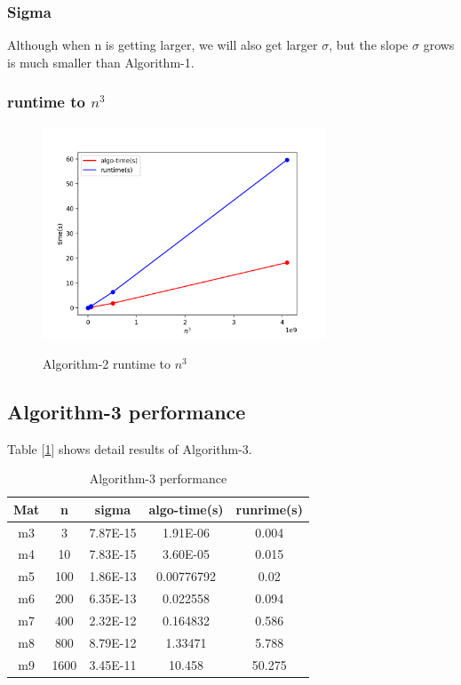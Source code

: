 \documentclass{article}
\begin{document}
\subsubsection{Sigma}
Although when n is getting larger, we will also get larger $\sigma$, but the slope $\sigma$ grows is much smaller than Algorithm-1.
\subsubsection{runtime to $n^3$}
\begin{figure}[H]
    \centering
    \caption{Algorithm-2 runtime to $n^3$}
    \includegraphics[width=0.75\textwidth]{src/algo2-runtime.png}
    \label{fig:algo2-runtime}
\end{figure}

\subsection{Algorithm-3 performance}
Table [\ref{tab:algo3}] shows detail results of Algorithm-3.
\begin{table}[htbp]
    \centering
    \caption{Algorithm-3 performance}
    \begin{tabular}{|c|c|c|c|c|}
        \hline
        Mat & \multicolumn{1}{c|}{n} & \multicolumn{1}{c|}{sigma} & \multicolumn{1}{l|}{algo-time(s)} & \multicolumn{1}{c|}{runrime(s)} \bigstrut\\
        \hline
        m3  & 3   & 7.87E-15 & 1.91E-06 & 0.004 \bigstrut\\
        \hline
        m4  & 10  & 7.83E-15 & 3.60E-05 & 0.015 \bigstrut\\
        \hline
        m5  & 100 & 1.86E-13 & 0.00776792 & 0.02 \bigstrut\\
        \hline
        m6  & 200 & 6.35E-13 & 0.022558 & 0.094 \bigstrut\\
        \hline
        m7  & 400 & 2.32E-12 & 0.164832 & 0.586 \bigstrut\\
        \hline
        m8  & 800 & 8.79E-12 & 1.33471 & 5.788 \bigstrut\\
        \hline
        m9  & 1600 & 3.45E-11 & 10.458 & 50.275 \bigstrut\\
        \hline
    \end{tabular}%
    \label{tab:algo3}
\end{table}%
\end{document}
